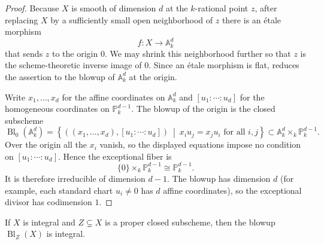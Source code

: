 \begin{proof}
Because $X$ is smooth of dimension $d$ at the $k$-rational point $z$, after
replacing $X$ by a sufficiently small open neighborhood of $z$ there is an
étale morphism
\[
f:X\longrightarrow \mathbb A_k^d
\]
that sends $z$ to the origin $0$. We may shrink this neighborhood further so
that $z$ is the scheme-theoretic inverse image of $0$. Since an étale
morphism is flat,  reduces the assertion
to the blowup of $\mathbb A_k^d$ at the origin.

Write $x_1,\ldots,x_d$ for the affine coordinates on $\mathbb A_k^d$ and
$[u_1:\cdots:u_d]$ for the homogeneous coordinates on
$\mathbb P_k^{d-1}$. The blowup of the origin is the closed subscheme
\[
\operatorname{Bl}_0(\mathbb A_k^d)
=
\left\{
((x_1,\ldots,x_d),[u_1:\cdots:u_d])
\ \middle|\
x_i u_j=x_j u_i\text{ for all }i,j
\right\}
\subset \mathbb A_k^d\times_k\mathbb P_k^{d-1}.
\]
Over the origin all the $x_i$ vanish, so the displayed equations impose no
condition on $[u_1:\cdots:u_d]$. Hence the exceptional fiber is
\[
\{0\}\times_k\mathbb P_k^{d-1}\cong\mathbb P_k^{d-1}.
\]
It is therefore irreducible of dimension $d-1$. The blowup has dimension
$d$ (for example, each standard chart $u_i\neq0$ has $d$ affine
coordinates), so the exceptional divisor has codimension $1$.
\end{proof}

\begin{theorem}\label{theorem:blowup_integral}
If $X$ is integral and $Z\subsetneq X$ is a proper closed subscheme, then the
blowup $\operatorname{Bl}_Z(X)$ is integral.
\end{theorem}
